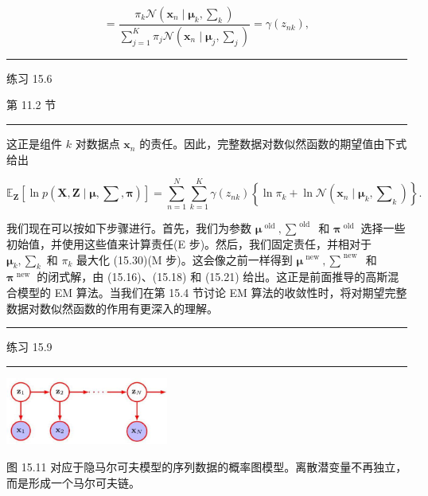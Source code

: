 \documentclass[10pt]{report}
\newcommand{\HRule}{\begin{center}\rule{0.9\linewidth}{0.2mm}\end{center}}
\begin{document}
\[
= \frac{{\pi }_{k}\mathcal{N}\left( {{\mathbf{x}}_{n} \mid  {\mathbf{\mu }}_{k},{\mathbf{\sum }}_{k}}\right) }{\mathop{\sum }\limits_{{j = 1}}^{K}{\pi }_{j}\mathcal{N}\left( {{\mathbf{x}}_{n} \mid  {\mathbf{\mu }}_{j},{\mathbf{\sum }}_{j}}\right) } = \gamma \left( {z}_{nk}\right) , \tag{15.29}
\]

\HRule

练习 15.6

第 11.2 节

\HRule

这正是组件 \(k\) 对数据点 \({\mathbf{x}}_{n}\) 的责任。因此，完整数据对数似然函数的期望值由下式给出

\[
{\mathbb{E}}_{\mathbf{Z}}\left\lbrack  {\ln p\left( {\mathbf{X},\mathbf{Z} \mid  \mathbf{\mu },\mathbf{\sum },\mathbf{\pi }}\right) }\right\rbrack   = \mathop{\sum }\limits_{{n = 1}}^{N}\mathop{\sum }\limits_{{k = 1}}^{K}\gamma \left( {z}_{nk}\right) \left\{  {\ln {\pi }_{k} + \ln \mathcal{N}\left( {{\mathbf{x}}_{n} \mid  {\mathbf{\mu }}_{k},{\mathbf{\sum }}_{k}}\right) }\right\}  . \tag{15.30}
\]

我们现在可以按如下步骤进行。首先，我们为参数 \({\mathbf{\mu }}^{\text{ old }},{\mathbf{\sum }}^{\text{ old }}\) 和 \({\mathbf{\pi }}^{\text{ old }}\) 选择一些初始值，并使用这些值来计算责任(E 步)。然后，我们固定责任，并相对于 \({\mathbf{\mu }}_{k},{\mathbf{\sum }}_{k}\) 和 \({\pi }_{k}\) 最大化 (15.30)(M 步)。这会像之前一样得到 \({\mathbf{\mu }}^{\text{ new }},{\mathbf{\sum }}^{\text{ new }}\) 和 \({\mathbf{\pi }}^{\text{ new }}\) 的闭式解，由 (15.16)、(15.18) 和 (15.21) 给出。这正是前面推导的高斯混合模型的 EM 算法。当我们在第 15.4 节讨论 EM 算法的收敛性时，将对期望完整数据对数似然函数的作用有更深入的理解。

\HRule

练习 15.9

\HRule

\begin{center}
\includegraphics[max width=0.4\textwidth]{images/0194e279-9b28-703a-88f4-c3ac21e2010d_499_1013_344_535_222_0.jpg}
\end{center}
\hspace*{3em} 

图 15.11 对应于隐马尔可夫模型的序列数据的概率图模型。离散潜变量不再独立，而是形成一个马尔可夫链。
\end{document}
